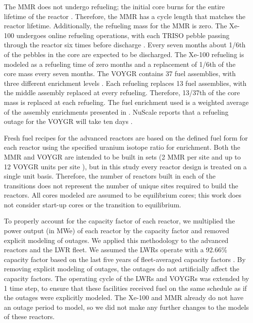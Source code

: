 The \gls{MMR} does not undergo refueling; the initial core
burns for the entire lifetime of the reactor \cite{mitchell_usnc_2020}. 
Therefore, the \gls{MMR} has a cycle length that 
matches the reactor lifetime. Additionally, the refueling mass for the
\gls{MMR} is zero. The Xe-100 undergoes online refueling operations, with 
each \gls{TRISO} pebble passing through the reactor six times before 
discharge \cite{mulder_overview_2021}. Every seven months about 1/6th 
of the pebbles in the core are expected to be discharged. The Xe-100 
refueling is modeled as a refueling time of zero months and a 
replacement of 1/6th of the core mass every seven months. 
The VOYGR contains 37 fuel assemblies, with three different enrichment 
levels \cite{nuscale_chapter_2020-1}. Each refueling replaces 13 fuel 
assemblies, with the middle assembly replaced at every refueling. 
Therefore, 13/37th of the core mass is replaced at each refueling. 
The fuel enrichment used is a weighted average of the assembly enrichments 
presented in \cite{nuscale_chapter_2020-1}. NuScale reports that a refueling 
outage for the VOYGR will take ten days \cite{nuscale_nuscale_2022}. 

Fresh fuel recipes for the advanced reactors are based on the 
defined fuel form for each reactor using the specified uranium isotope 
ratio for enrichment. Both the \gls{MMR} and VOYGR are intended to be built 
in sets (2 \gls{MMR} per site \cite{noauthor_usnc_2021} and up to 12 VOYGR 
units per site \cite{reyes_nuscale_2021}), but in this study every reactor 
design is treated 
on a single unit basis. Therefore, the number of reactors built in each 
of the transitions does not represent the number of unique sites required 
to build the reactors. All cores modeled are assumed to be equilibrium cores; 
this work does not consider start-up cores or the transition to equilibrium. 

To properly account for the capacity factor of each reactor, we multiplied 
the power output (in MWe) of each reactor by the capacity factor and 
removed explicit modeling of outages. We applied this methodology to the 
advanced reactors and the \gls{LWR} fleet. We assumed the \glspl{LWR}
operate with a 92.66\% capacity factor based on the last five years of 
fleet-averaged capacity factors 
\cite{us_energy_information_administration_electric_2022}. 
By removing explicit modeling of outages, the outages do not artificially affect 
the capacity factors. The operating cycle of the \glspl{LWR} and VOYGRs 
was extended by 1 time step, to ensure that these facilities received fuel 
on the same schedule as if the outages were explicitly modeled. The Xe-100 
and \gls{MMR} already do not have an outage period to model, so we did 
not make any further changes to the models of these reactors. 

